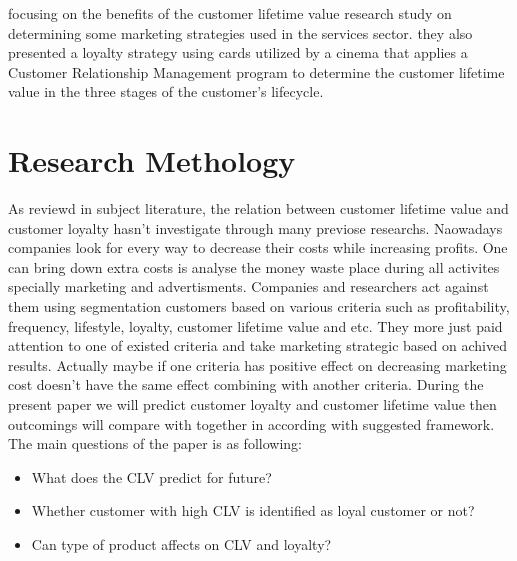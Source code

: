 \documentclass{article}
\begin{document}
focusing on the benefits of the customer lifetime value research study on determining some marketing strategies used in the services sector.  they also presented a loyalty strategy using cards utilized by a cinema that applies a Customer Relationship Management program to determine the customer lifetime value in the three stages of the customer’s lifecycle.


\section{Research Methology}\label{sec.Model}
\par As reviewd in subject literature, the relation between customer lifetime value and customer loyalty hasn't investigate through many previose researchs. Naowadays companies look for every way to decrease their costs while increasing profits. One can bring down extra costs is analyse the money waste place during all activites specially marketing and advertisments. Companies and researchers act against them using segmentation customers based on various criteria such as profitability, frequency, lifestyle, loyalty, customer lifetime value and etc. They more just paid attention to one of existed criteria and take marketing strategic based on achived results. Actually maybe if one criteria has positive effect on decreasing marketing cost doesn't have the same effect combining with another criteria. During the present paper we will predict customer loyalty and customer lifetime value then outcomings will compare with together in according with suggested framework. The main questions of the paper is as following:

\begin{itemize}
  \item What does the CLV predict for future?
  \item Whether customer with high CLV is identified as loyal customer or not?
  \item Can type of product affects on CLV and loyalty?
\end{itemize}
\end{document}
